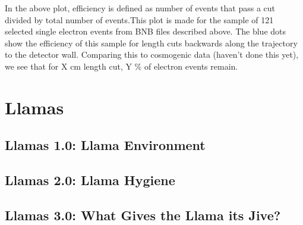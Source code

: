 \documentclass[10pt]{article}
\begin{document}
In the above plot, efficiency is defined as number of events that pass a cut divided by total number of events.This plot is made for the sample of 121 selected single electron events from BNB files described above.  The blue dots show the efficiency of this sample for length cuts backwards along the trajectory to the detector wall.  Comparing this to cosmogenic data (haven't done this yet), we see that for X cm length cut, Y \% of electron events remain. 
	
\section{Llamas}
\subsection{Llamas 1.0: Llama Environment}
\subsection{Llamas 2.0: Llama Hygiene}
\subsection{Llamas 3.0: What Gives the Llama its Jive?}
	
\end{document}
